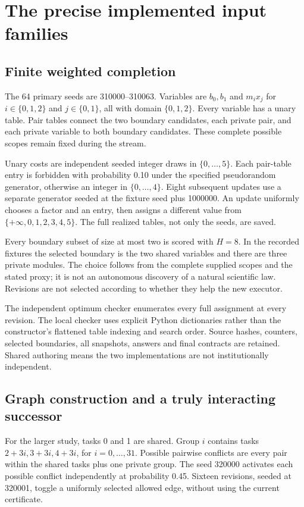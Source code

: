 \documentclass[11pt,letterpaper]{article}
\theoremstyle{definition}\newtheorem{definition}[theorem]{Definition}
\theoremstyle{remark}\newtheorem{remark}[theorem]{Remark}
\begin{document}
\section{The precise implemented input families}
\label{app:fixtures}
\subsection{Finite weighted completion}
The 64 primary seeds are 310000--310063. Variables are $b_0,b_1$ and $m_ix_j$ for $i\in\{0,1,2\}$ and $j\in\{0,1\}$, all with domain $\{0,1,2\}$. Every variable has a unary table. Pair tables connect the two boundary candidates, each private pair, and each private variable to both boundary candidates. These complete possible scopes remain fixed during the stream.

Unary costs are independent seeded integer draws in $\{0,\ldots,5\}$. Each pair-table entry is forbidden with probability 0.10 under the specified pseudorandom generator, otherwise an integer in $\{0,\ldots,4\}$. Eight subsequent updates use a separate generator seeded at the fixture seed plus 1000000. An update uniformly chooses a factor and an entry, then assigns a different value from $\{+\infty,0,1,2,3,4,5\}$. The full realized tables, not only the seeds, are saved.

Every boundary subset of size at most two is scored with $H=8$. In the recorded fixtures the selected boundary is the two shared variables and there are three private modules. The choice follows from the complete supplied scopes and the stated proxy; it is not an autonomous discovery of a natural scientific law. Revisions are not selected according to whether they help the new executor.

The independent optimum checker enumerates every full assignment at every revision. The local checker uses explicit Python dictionaries rather than the constructor's flattened table indexing and search order. Source hashes, counters, selected boundaries, all snapshots, answers and final contracts are retained. Shared authoring means the two implementations are not institutionally independent.

\subsection{Graph construction and a truly interacting successor}
For the larger study, tasks 0 and 1 are shared. Group $i$ contains tasks $2+3i,3+3i,4+3i$, for $i=0,\ldots,31$. Possible pairwise conflicts are every pair within the shared tasks plus one private group. The seed 320000 activates each possible conflict independently at probability 0.45. Sixteen revisions, seeded at 320001, toggle a uniformly selected allowed edge, without using the current certificate.
\end{document}
